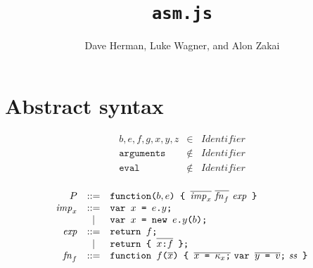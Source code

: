 \documentclass{article}
\newcommand{\funcall}[2]{{#1}\mathjs{(}{#2}\mathjs{)}}
\newcommand{\paren}[1]{\mathjs{(}{#1}\mathjs{)}}
\newcommand{\seq}[1]{\overline{{#1}}}
\newcommand{\mathjs}[1]{\mbox{\texttt{{#1}}}}
\newcommand{\return}[1]{\mathjs{return }{#1}\mathjs{;}}
\newcommand{\fun}[3]{\mathjs{function }{#1}\mathjs{(}{#2}\mathjs{) \{ }{#3}\mathjs{ \}}}
\newcommand{\var}[1]{\mathjs{var }{#1}\mathjs{;}}
\newcommand{\function}{\mathtt{function}}
\begin{document}
\title{\texttt{asm.js}}
\author{Dave Herman, Luke Wagner, and Alon Zakai}
\maketitle

\section{Abstract syntax}

\[
\begin{array}{rcl}
b, e, f, g, x, y, z & \in & \mathit{Identifier} \\
\mathtt{arguments} & \not\in & \mathit{Identifier} \\
\mathtt{eval} & \not\in & \mathit{Identifier} \\
\end{array}
\]

\[
\begin{array}{rcl}
P               & ::= & \function\paren{b, e}\mathjs{ \{ } \seq{\mathit{imp}_x}\ \seq{\mathit{fn}_f}\ \mathit{exp}\mathjs{ \}} \\
\mathit{imp}_x  & ::= & \var{x \mathjs{ = } e\mathjs{.}y} \\
                &  |  & \var{x \mathjs{ = } \mathjs{new }\funcall{e\mathjs{.}y}{b}} \\
\mathit{exp}    & ::= & \return{f} \\
                &  |  & \return{\mathjs{\{ } \seq{x \mathjs{:} f} \mathjs{ \}}} \\
\mathit{fn}_f   & ::= & \fun{f}{\seq{x}}{\seq{x\mathjs{ = }\kappa_x\mathjs{;}}\ \var{\seq{y\mathjs{ = }v}}\ \mathit{ss}} \\
\end{array}
\]
\end{document}
